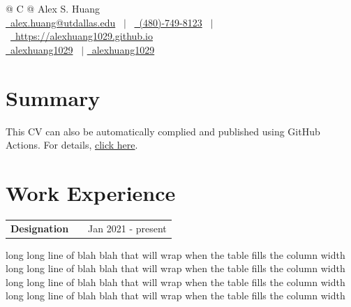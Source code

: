 \documentclass[letterpaper,12pt]{article}
\makeatletter
\newenvironment{jobshort}[2]
    {
    \begin{tabularx}{\linewidth}{@{}l X r@{}}
    \textbf{#1} & \hfill &  #2 \\[3.75pt]
    \end{tabularx}
    }
    {
    }
\makeatother
\begin{document}
\pagestyle{empty} 



\begin{tabularx}{\linewidth}{@{} C @{}}
\Huge{Alex S. Huang} \\[7.5pt]
\href{mailto:alex.huang@utdallas.edu}{\raisebox{-0.05\height}\faEnvelope\ alex.huang@utdallas.edu} \ $|$ \
\href{tel:+(480)-749-8123}{\raisebox{-0.05\height}\faMobile\ (480)-749-8123} \ $|$ \
\href{https://mysite.com}{\raisebox{-0.05\height}\faGlobe\ https://alexhuang1029.github.io} \\
\href{https://github.com/username}{\raisebox{-0.05\height}\faGithub\ alexhuang1029} \ $|$ 
\href{https://linkedin.com/in/username}{\raisebox{-0.05\height}\faLinkedin\ alexhuang1029} \\
\end{tabularx}


\section{Summary}
This CV can also be automatically complied and published using GitHub Actions. For details, \href{https://github.com/jitinnair1/autoCV}{click here}.

\section{Work Experience}

\begin{jobshort}{Designation}{Jan 2021 - present}
long long line of blah blah that will wrap when the table fills the column width long long line of blah blah that will wrap when the table fills the column width long long line of blah blah that will wrap when the table fills the column width long long line of blah blah that will wrap when the table fills the column width
\end{jobshort}
\end{document}
